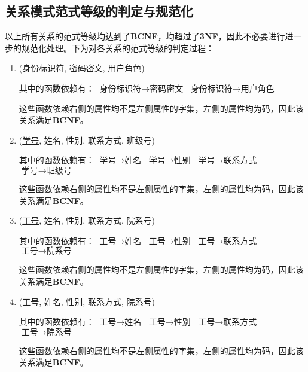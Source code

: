 \subsection{关系模式范式等级的判定与规范化}
\ttfamily
以上所有关系的范式等级均达到了\textnormal{\textbf{BCNF}}，均超过了\textnormal{\textbf{3NF}}，因此不必要进行进一步的规范化处理。下为对各关系的范式等级的判定过程：

\normalfont

\begin{enumerate}
    \item (\uline{身份标识符}, 密码密文, 用户角色) \par
    其中的函数依赖有： \newline
    $\text{身份标识符} \rightarrow \text{密码密文}$ \newline
    $\text{身份标识符} \rightarrow \text{用户角色}$ \par
    这些函数依赖右侧的属性均不是左侧属性的字集，左侧的属性均为码，因此该关系满足\textbf{BCNF}。

    \item (\uline{学号}, 姓名, 性别, 联系方式, 班级号) \par
    其中的函数依赖有： \newline
    $\text{学号} \rightarrow \text{姓名}$ \newline
    $\text{学号} \rightarrow \text{性别}$ \newline
    $\text{学号} \rightarrow \text{联系方式}$ \newline
    $\text{学号} \rightarrow \text{班级号}$ \par
    这些函数依赖右侧的属性均不是左侧属性的字集，左侧的属性均为码，因此该关系满足\textbf{BCNF}。

    \item (\uline{工号}, 姓名, 性别, 联系方式, 院系号) \par
    其中的函数依赖有： \newline
    $\text{工号} \rightarrow \text{姓名}$ \newline
    $\text{工号} \rightarrow \text{性别}$ \newline
    $\text{工号} \rightarrow \text{联系方式}$ \newline
    $\text{工号} \rightarrow \text{院系号}$ \par
    这些函数依赖右侧的属性均不是左侧属性的字集，左侧的属性均为码，因此该关系满足\textbf{BCNF}。
    
    \item (\uline{工号}, 姓名, 性别, 联系方式, 院系号) \par
    其中的函数依赖有： \newline
    $\text{工号} \rightarrow \text{姓名}$ \newline
    $\text{工号} \rightarrow \text{性别}$ \newline
    $\text{工号} \rightarrow \text{联系方式}$ \newline
    $\text{工号} \rightarrow \text{院系号}$ \par
    这些函数依赖右侧的属性均不是左侧属性的字集，左侧的属性均为码，因此该关系满足\textbf{BCNF}。
    

\end{enumerate}
